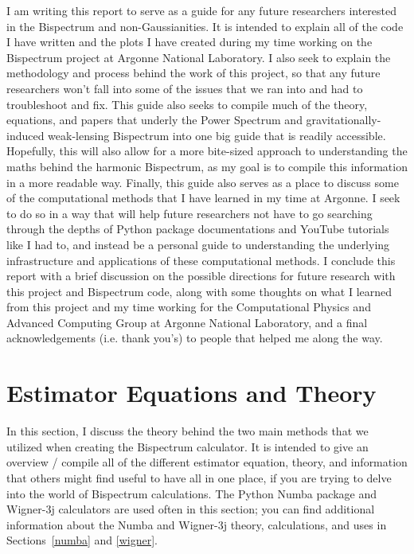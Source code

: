 \documentclass[11pt]{article}
\renewcommand{\_}[1]{\underline{ #1 }}
\begin{document}
{I am writing this report to serve as a guide for any future researchers interested in the Bispectrum and non-Gaussianities. It is intended to explain all of the code I have written and the plots I have created during my time working on the Bispectrum project at Argonne National Laboratory. I also seek to explain the methodology and process behind the work of this project, so that any future researchers won't fall into some of the issues that we ran into and had to troubleshoot and fix. This guide also seeks to compile much of the theory, equations, and papers that underly the Power Spectrum and gravitationally-induced weak-lensing Bispectrum into one big guide that is readily accessible. Hopefully, this will also allow for a more bite-sized approach to understanding the maths behind the harmonic Bispectrum, as my goal is to compile this information in a more readable way. Finally, this guide also serves as a place to discuss some of the computational methods that I have learned in my time at Argonne. I seek to do so in a way that will help future researchers not have to go searching through the depths of Python package documentations and YouTube tutorials like I had to, and instead be a personal guide to understanding the underlying infrastructure and applications of these computational methods. I conclude this report with a brief discussion on the possible directions for future research with this project and Bispectrum code, along with some thoughts on what I learned from this project and my time working for the Computational Physics and Advanced Computing Group at Argonne National Laboratory, and a final acknowledgements (i.e. thank you's) to people that helped me along the way.

\section{Estimator Equations and Theory}\label{theory}

In this section, I discuss the theory behind the two main methods that we utilized when creating the Bispectrum calculator. It is intended to give an overview / compile all of the different estimator equation, theory, and information that others might find useful to have all in one place, if you are trying to delve into the world of Bispectrum calculations. The Python Numba package and Wigner-3j calculators are used often in this section; you can find additional information about the Numba and Wigner-3j theory, calculations, and uses in Sections~\ref{numba} and \ref{wigner}.

}
\end{document}
